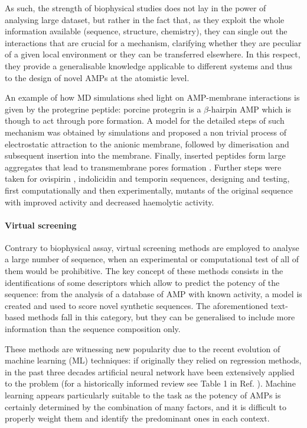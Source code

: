 As such, the strength of biophysical studies does not lay in the power of analysing large dataset, but rather in the fact that, as they exploit the whole information available (sequence, structure, chemistry), they can single out the interactions that are crucial for a mechanism, clarifying whether they are peculiar of a given local environment or they can be transferred elsewhere. In this respect, they provide a generalisable knowledge applicable to different systems and thus to the design of novel AMPs at the atomistic level.

An example of how MD simulations shed light on AMP-membrane interactions is given by the protegrine peptide: porcine protegrin is a $\beta$-hairpin AMP which is though to act through pore formation. A model for the detailed steps of such mechanism was obtained by simulations and proposed a non trivial process of electrostatic attraction to the anionic membrane, followed by dimeri­sation and subsequent insertion into the membrane. Finally, inserted peptides form large aggregates that lead to transmem­brane pores formation \cite{Bolintineanu2011}.
%
Further steps were taken for ovispirin \cite{Khandelia2005}, indolicidin \cite{Tsai2009} and temporin \cite{Farrotti2017} sequences, designing and testing, first computationally and then experimentally, mutants of the original sequence with improved activity and decreased haemolytic activity.

\paragraph{Virtual screening}
Contrary to biophysical assay, virtual screening methods are employed to analyse a large number of sequence, when an experimental or computational test of all of them would be prohibitive. The key concept of these methods consists in the identifications of some descriptors which allow to predict the potency of the sequence: from the analysis of a database of AMP with known activity, a model is created and used to score novel synthetic sequences. The aforementioned text-based methods fall in this category, but they can be generalised to include more information than the sequence composition only.

These methods are witnessing new popularity due to the recent evolution of machine learning (ML) techniques: if originally they relied on regression methods, in the past three decades artificial neural network have been extensively applied to the problem (for a historically informed review see Table 1 in Ref. \cite{Fjell2011}). Machine learning appears particularly suitable to the task as the potency of AMPs is certainly determined by the combination of many factors, and it is difficult to properly weight them and identify the predominant ones in each context.

